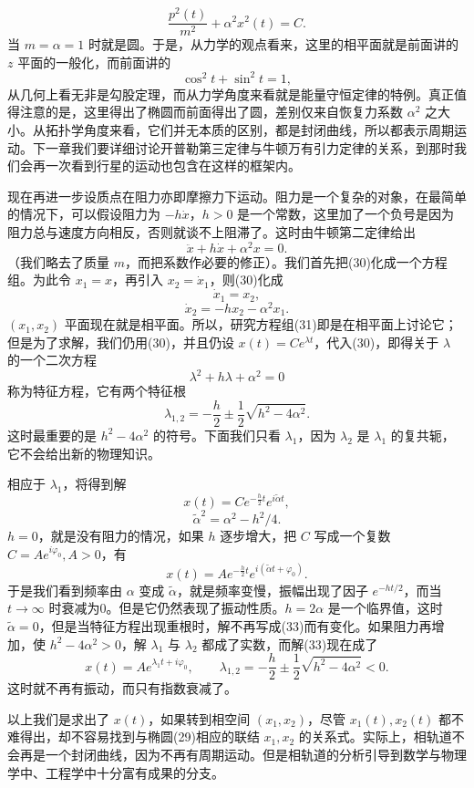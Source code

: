 \[
\frac{p^2(t)}{m^2}+\alpha^2x^2(t)=C.
\]
当 $m=\alpha=1$ 时就是圆。于是，从力学的观点看来，这里的相平面就是前面讲的 $z$ 平面的一般化，而前面讲的
\[
\cos^2t+\sin^2t=1,
\]
从几何上看无非是勾股定理，而从力学角度来看就是能量守恒定律的特例。真正值得注意的是，这里得出了椭圆而前面得出了圆，差别仅来自恢复力系数 $\alpha^2$ 之大小。从拓扑学角度来看，它们并无本质的区别，都是封闭曲线，所以都表示周期运动。下一章我们要详细讨论开普勒第三定律与牛顿万有引力定律的关系，到那时我们会再一次看到行星的运动也包含在这样的框架内。

现在再进一步设质点在阻力亦即摩擦力下运动。阻力是一个复杂的对象，在最简单的情况下，可以假设阻力为 $-h\dot x$，$h>0$ 是一个常数，这里加了一个负号是因为阻力总与速度方向相反，否则就谈不上阻滞了。这时由牛顿第二定律给出
\[
\ddot x+h\dot x+\alpha^2x=0. \tag{30}
\]
（我们略去了质量 $m$，而把系数作必要的修正）。我们首先把(30)化成一个方程组。为此令 $x_1=x$，再引入 $x_2=\dot x_1$，则(30)化成
\[
\dot x_1=x_2,
\]
\[
\dot x_2=-hx_2-\alpha^2x_1. \tag{31}
\]
$(x_1,x_2)$ 平面现在就是相平面。所以，研究方程组(31)即是在相平面上讨论它；但是为了求解，我们仍用(30)，并且仍设 $x(t)=Ce^{\lambda t}$，代入(30)，即得关于 $\lambda$ 的一个二次方程
\[
\lambda^2+h\lambda+\alpha^2=0 \tag{32}
\]
称为特征方程，它有两个特征根
\[
\lambda_{1,2}=-\frac h2\pm\frac12\sqrt{h^2-4\alpha^2}.
\]
这时最重要的是 $h^2-4\alpha^2$ 的符号。下面我们只看 $\lambda_1$，因为 $\lambda_2$ 是 $\lambda_1$ 的复共轭，它不会给出新的物理知识。

相应于 $\lambda_1$，将得到解
\[
x(t)=Ce^{-\frac h2t}e^{i\widetilde\alpha t}, \tag{33}
\]
\[
\widetilde\alpha^2=\alpha^2-h^2/4.
\]
$h=0$，就是没有阻力的情况，如果 $h$ 逐步增大，把 $C$ 写成一个复数 $C=Ae^{i\varphi_0},A>0$，有
\[
x(t)=Ae^{-\frac h2t}e^{i(\widetilde\alpha t+\varphi_0)}.
\]
于是我们看到频率由 $\alpha$ 变成 $\widetilde\alpha$，就是频率变慢，振幅出现了因子 $e^{-ht/2}$，而当 $t\to\infty$ 时衰减为0。但是它仍然表现了振动性质。$h=2\alpha$ 是一个临界值，这时 $\widetilde\alpha=0$，但是当特征方程出现重根时，解不再写成(33)而有变化。如果阻力再增加，使 $h^2-4\alpha^2>0$，解 $\lambda_1$ 与 $\lambda_2$ 都成了实数，而解(33)现在成了
\[
x(t)=Ae^{\lambda_1t+i\varphi_0},
\qquad
\lambda_{1,2}=-\frac h2\pm\frac12\sqrt{h^2-4\alpha^2}<0.
\]
这时就不再有振动，而只有指数衰减了。

以上我们是求出了 $x(t)$，如果转到相空间 $(x_1,x_2)$，尽管 $x_1(t),x_2(t)$ 都不难得出，却不容易找到与椭圆(29)相应的联结 $x_1,x_2$ 的关系式。实际上，相轨道不会再是一个封闭曲线，因为不再有周期运动。但是相轨道的分析引导到数学与物理学中、工程学中十分富有成果的分支。
